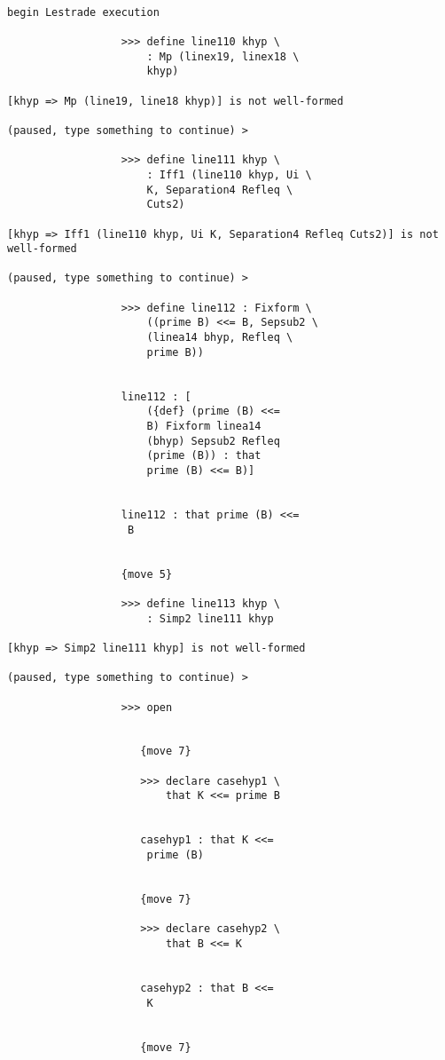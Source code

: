 \documentclass[12pt]{article}
\begin{document}
\begin{verbatim}

begin Lestrade execution

                  >>> define line110 khyp \
                      : Mp (linex19, linex18 \
                      khyp)

[khyp => Mp (line19, line18 khyp)] is not well-formed

(paused, type something to continue) >

                  >>> define line111 khyp \
                      : Iff1 (line110 khyp, Ui \
                      K, Separation4 Refleq \
                      Cuts2)

[khyp => Iff1 (line110 khyp, Ui K, Separation4 Refleq Cuts2)] is not well-formed

(paused, type something to continue) >

                  >>> define line112 : Fixform \
                      ((prime B) <<= B, Sepsub2 \
                      (linea14 bhyp, Refleq \
                      prime B))


                  line112 : [
                      ({def} (prime (B) <<= 
                      B) Fixform linea14 
                      (bhyp) Sepsub2 Refleq 
                      (prime (B)) : that 
                      prime (B) <<= B)]


                  line112 : that prime (B) <<= 
                   B


                  {move 5}

                  >>> define line113 khyp \
                      : Simp2 line111 khyp

[khyp => Simp2 line111 khyp] is not well-formed

(paused, type something to continue) >

                  >>> open


                     {move 7}

                     >>> declare casehyp1 \
                         that K <<= prime B


                     casehyp1 : that K <<= 
                      prime (B)


                     {move 7}

                     >>> declare casehyp2 \
                         that B <<= K


                     casehyp2 : that B <<= 
                      K


                     {move 7}


\end{verbatim}
\end{document}
